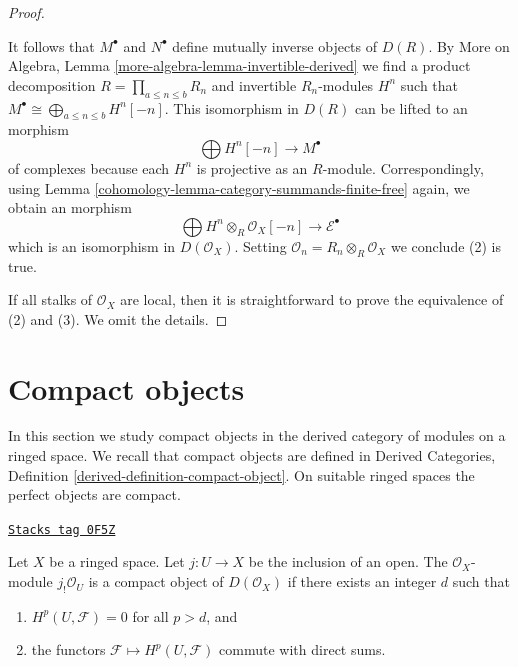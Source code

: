 \begin{proof}
\begin{enumerate}
\end{enumerate}
It follows that $M^\bullet$ and $N^\bullet$ define
mutually inverse objects of $D(R)$. By
More on Algebra, Lemma \ref{more-algebra-lemma-invertible-derived}
we find a product decomposition $R = \prod_{a \leq n \leq b} R_n$
and invertible $R_n$-modules $H^n$ such
that $M^\bullet \cong \bigoplus_{a \leq n \leq b} H^n[-n]$.
This isomorphism in $D(R)$ can be lifted to an morphism
$$
\bigoplus H^n[-n] \longrightarrow M^\bullet
$$
of complexes because each $H^n$ is projective as an $R$-module.
Correspondingly, using Lemma \ref{cohomology-lemma-category-summands-finite-free} again,
we obtain an morphism
$$
\bigoplus H^n \otimes_R \mathcal{O}_X[-n] \to \mathcal{E}^\bullet
$$
which is an isomorphism in $D(\mathcal{O}_X)$. Setting
$\mathcal{O}_n = R_n \otimes_R \mathcal{O}_X$ we conclude (2) is true.

\medskip\noindent
If all stalks of $\mathcal{O}_X$ are local, then it is straightforward
to prove the equivalence of (2) and (3). We omit the details.
\end{proof}

\section{Compact objects}
\label{cohomology-section-compact}
In this section we study compact objects in the derived category of modules
on a ringed space. We recall that compact objects are defined in
Derived Categories, Definition \ref{derived-definition-compact-object}.
On suitable ringed spaces the perfect objects are compact.

\begin{lemma}
\label{cohomology-lemma-when-jshriek-compact}
\href{https://stacks.math.columbia.edu/tag/0F5Z}{\texttt{Stacks tag 0F5Z}}

Let $X$ be a ringed space. Let $j : U \to X$ be the
inclusion of an open. The $\mathcal{O}_X$-module $j_!\mathcal{O}_U$ is a
compact object of $D(\mathcal{O}_X)$ if there exists an integer $d$ such that
\begin{enumerate}
\item $H^p(U, \mathcal{F}) = 0$ for all $p > d$, and
\item the functors $\mathcal{F} \mapsto H^p(U, \mathcal{F})$
commute with direct sums.
\end{enumerate}
\end{lemma}

